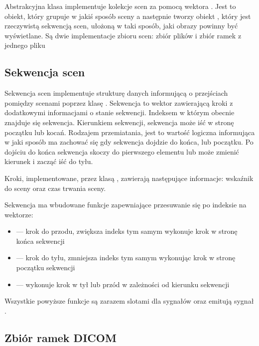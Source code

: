 \label{sec:sokar-scenesets}

Abstrakcyjna klasa  implementuje kolekcje scen za pomocą wektora .
Jest to obiekt, który grupuje w jakiś sposób sceny a następnie tworzy obiekt , który jest rzeczywistą sekwencją scen, ułożoną w taki sposób, jaki obrazy powinny być wyświetlane.
Są dwie implementacje zbioru scen: zbiór plików i zbiór ramek z jednego pliku

\subsection{Sekwencja scen}
\label{sec:sokar-scenesequence}

\par
Sekwencja scen implementuje strukturę danych informującą o przejściach pomiędzy scenami poprzez klasę .
Sekwencja to wektor zawierającą kroki z dodatkowymi informacjami o stanie sekwencji.
Indeksem w którym obecnie znajduje się sekwencja.
Kierunkiem sekwencji, sekwencja może iść w stronę początku lub kocań.
Rodzajem przemiatania, jest to wartość logiczna informująca w jaki sposób ma zachować się gdy sekwencja dojdzie do końca, lub początku.
Po dojściu do końca sekwencja skoczy do pierwszego elementu lub może zmienić kierunek i zacząć iść do tyłu.

\par
Kroki, implementowane, przez klasą , zawierają następujące informacje: wskaźnik do sceny oraz czas trwania sceny.

\par
Sekwencja ma wbudowane funkcje zapewniające przesuwanie się po indeksie na wektorze:
\begin{itemize}
    \item {} --- krok do przodu, zwiększa indeks tym samym wykonuje krok w stronę końca sekwencji
    \item {} --- krok do tyłu, zmniejsza indeks tym samym wykonując krok w stronę początku sekwencji
    \item {} --- wykonuje krok w tył lub przód w zależności od kierunku sekwencji
\end{itemize}
Wszystkie powyższe funkcje są zarazem slotami dla sygnałów oraz emitują sygnał .

\subsection{Zbiór ramek DICOM}
\label{sec:sokar-dicomframeset}

